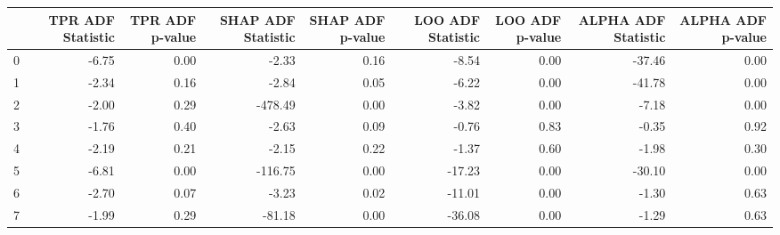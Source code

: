 \begin{tabular}{lrrrrrrrr}
\toprule
 & TPR ADF Statistic & TPR ADF p-value & SHAP ADF Statistic & SHAP ADF p-value & LOO ADF Statistic & LOO ADF p-value & ALPHA ADF Statistic & ALPHA ADF p-value \\
\midrule
0 & -6.75 & 0.00 & -2.33 & 0.16 & -8.54 & 0.00 & -37.46 & 0.00 \\
1 & -2.34 & 0.16 & -2.84 & 0.05 & -6.22 & 0.00 & -41.78 & 0.00 \\
2 & -2.00 & 0.29 & -478.49 & 0.00 & -3.82 & 0.00 & -7.18 & 0.00 \\
3 & -1.76 & 0.40 & -2.63 & 0.09 & -0.76 & 0.83 & -0.35 & 0.92 \\
4 & -2.19 & 0.21 & -2.15 & 0.22 & -1.37 & 0.60 & -1.98 & 0.30 \\
5 & -6.81 & 0.00 & -116.75 & 0.00 & -17.23 & 0.00 & -30.10 & 0.00 \\
6 & -2.70 & 0.07 & -3.23 & 0.02 & -11.01 & 0.00 & -1.30 & 0.63 \\
7 & -1.99 & 0.29 & -81.18 & 0.00 & -36.08 & 0.00 & -1.29 & 0.63 \\
\bottomrule
\end{tabular}
